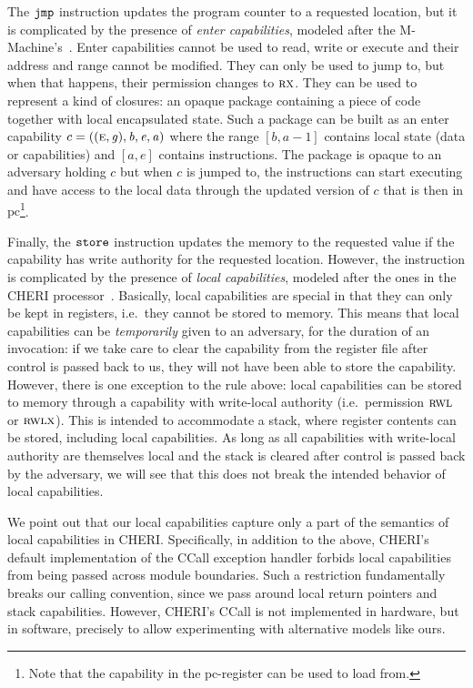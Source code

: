 \documentclass[acmsmall,review]{acmart}\settopmatter{printfolios=true}
\newcommand\lau[1]{{\color{purple} \sf \footnotesize {LS: #1}}\\}
\newcommand{\var}[1]{\mathit{#1}}
\newcommand{\gl}{\var{g}}
\newcommand{\pcreg}{\mathrm{pc}}
\newcommand{\addr}{\var{a}}
\newcommand{\start}{\var{b}}
\newcommand{\addrend}{\var{e}}
\newcommand{\zinstr}[1]{\mathtt{#1}}
\newcommand{\oneinstr}[2]{
  \ifthenelse{\equal{#2}{}}
  {\zinstr{#1}}
  {\zinstr{#1} \; #2}
}
\newcommand{\jmp}[1]{\oneinstr{jmp}{#1}}
\newcommand{\twoinstr}[3]{
  \ifthenelse{\equal{#2#3}{}}
  {\zinstr{#1}}
  {\zinstr{#1} \; #2 \; #3}
}
\newcommand{\store}[2]{\twoinstr{store}{#1}{#2}}
\newcommand{\plainperm}[1]{\textsc{#1}}
\newcommand{\exec}{\plainperm{rx}}
\newcommand{\entry}{\plainperm{e}}
\newcommand{\readwritel}{\plainperm{rwl}}
\newcommand{\rwl}{\readwritel}
\newcommand{\rwlx}{\plainperm{rwlx}}
\begin{document}
The $\jmp{}$ instruction updates the program counter to a requested location,
but it is complicated by the presence of \emph{enter capabilities}, modeled
after the M-Machine's~\citep{Carter:1994:HSF:195473.195579}. Enter capabilities
cannot be used to read, write or execute and their address and range cannot be
modified. They can only be used to jump to, but when that happens, their
permission changes to $\exec$. They can be used to represent a kind of closures:
an opaque package containing a piece of code together with local encapsulated
state. Such a package can be built as an enter capability $c =
((\entry,\gl),\start,\addrend,\addr)$ where the range $[\start,\addr-1]$
contains local state (data or capabilities) and $[\addr,\addrend]$ contains
instructions. The package is opaque to an adversary holding $c$ but when $c$ is
jumped to, the instructions can start executing and have access to the local
data through the updated version of $c$ that is then in $\pcreg$\footnote{Note
  that the capability in the $\pcreg$-register can be used to load from.}.

Finally, the $\store{}{}$ instruction updates the memory to the requested value
if the capability has write authority for the requested location. However, the
instruction is complicated by the presence of \emph{local capabilities}, modeled
after the ones in the CHERI processor~\citep{Watson2015Cheri}. Basically, local
capabilities are special in that they can only be kept in registers, i.e.\ they
cannot be stored to memory. This means that local capabilities can be
\emph{temporarily} given to an adversary, for the duration of an invocation: if
we take care to clear the capability from the register file after control is
passed back to us, they will not have been able to store the capability.
However, there is one exception to the rule above: local capabilities can be
stored to memory through a capability with write-local authority
(i.e.\ permission $\rwl$ or $\rwlx$). This is intended to accommodate a stack,
where register contents can be stored, including local capabilities. As long as all
capabilities with write-local authority are themselves local and the stack is
cleared after control is passed back by the adversary, we will see that this
does not break the intended behavior of local capabilities.

We point out that our local capabilities capture only a part of the semantics of
local capabilities in CHERI. Specifically, in addition to the above, CHERI's
default implementation of the CCall exception handler forbids local capabilities
from being passed across module boundaries. Such a restriction fundamentally
breaks our calling convention, since we pass around local return pointers and
stack capabilities. However, CHERI's CCall is not implemented in hardware, but
in software, precisely to allow experimenting with alternative models like ours.
\end{document}
